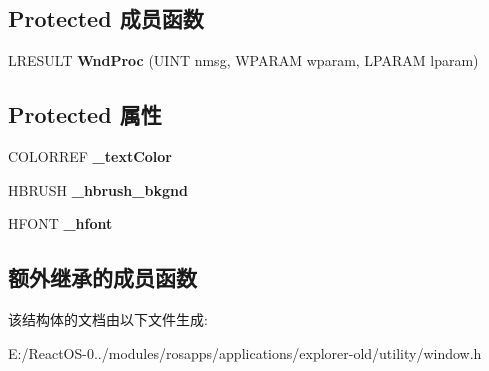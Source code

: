 \subsection*{Protected 成员函数}
\begin{DoxyCompactItemize}
\item 
\mbox{\label{struct_color_static_ac37fe166c322cb8209dfef968c1d427c}} 
L\+R\+E\+S\+U\+LT {\bfseries Wnd\+Proc} (U\+I\+NT nmsg, W\+P\+A\+R\+AM wparam, L\+P\+A\+R\+AM lparam)
\end{DoxyCompactItemize}
\subsection*{Protected 属性}
\begin{DoxyCompactItemize}
\item 
\mbox{\label{struct_color_static_ac2a8af72f46518205ed8bffaf443539f}} 
C\+O\+L\+O\+R\+R\+EF {\bfseries \+\_\+text\+Color}
\item 
\mbox{\label{struct_color_static_ab03c6b7c9a9a087a738ad40bdb594ec8}} 
H\+B\+R\+U\+SH {\bfseries \+\_\+hbrush\+\_\+bkgnd}
\item 
\mbox{\label{struct_color_static_a2438b9e16a0be5afae571c93adb2062a}} 
H\+F\+O\+NT {\bfseries \+\_\+hfont}
\end{DoxyCompactItemize}
\subsection*{额外继承的成员函数}


该结构体的文档由以下文件生成\+:\begin{DoxyCompactItemize}
\item 
E\+:/\+React\+O\+S-\/0../modules/rosapps/applications/explorer-\/old/utility/window.\+h\end{DoxyCompactItemize}

